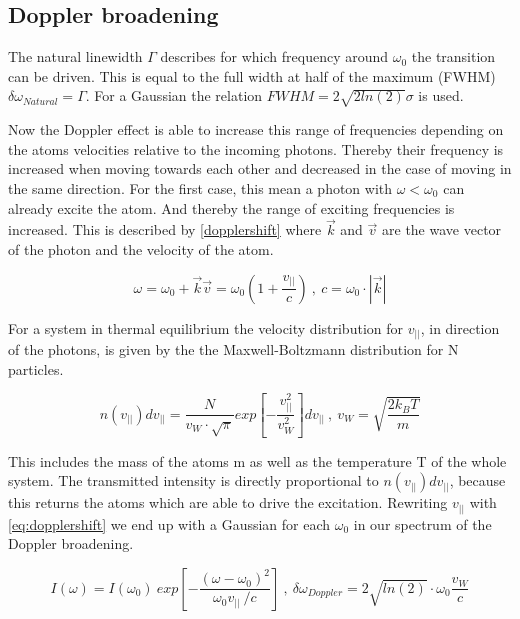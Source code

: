 \documentclass[]{article}
\begin{document}
\subsection{Doppler broadening}
The natural linewidth $\Gamma$ describes for which frequency around $\omega_0$ the transition can be driven. This is equal to the full width at half of the maximum (FWHM) $\delta\omega_{Natural} = \Gamma$. For a Gaussian the relation $FWHM = 2 \sqrt{2ln(2)} \sigma$ is used.

Now the Doppler effect is able to increase this range of frequencies depending on the atoms velocities relative to the incoming photons. Thereby their frequency is increased when moving towards each other and decreased in the case of moving in the same direction. For the first case, this mean a photon with $\omega < \omega_0$ can already excite the atom. And thereby the range of exciting frequencies is increased. This is described by \autoref{dopplershift} where $\vec{k}$ and $\vec{v}$ are the wave vector of the photon and the velocity of the atom.

\begin{equation}
\omega  = \omega_0 + \vec{k}\vec{v} = \omega_0 \left(1+\frac{v_{||}}{c} \right)\:,\: c = \omega_0\cdot |\vec{k}|
\label{eq:dopplershift}
\end{equation}

For a system in thermal equilibrium the velocity distribution for $v_{||}$, in direction of the photons, is given by the the Maxwell-Boltzmann distribution for N particles. 

\begin{equation}
n(v_{||})dv_{||} = \frac{N}{v_W \cdot \sqrt{\pi}} exp\left[ - \frac{v_{||}^2}{v_W^2} \right] dv_{||} \:,\: v_W= \sqrt{\frac{2k_BT}{m}}
\end{equation}

This includes the mass of the atoms m as well as the temperature T of the whole system. The transmitted intensity is directly proportional to $n(v_{||}) dv_{||}$, because this returns the atoms which are able to drive the excitation. Rewriting $v_{||}$ with \autoref{eq:dopplershift} we end up with a Gaussian for each $\omega_0$ in our spectrum of the Doppler broadening.

\begin{equation}
I(\omega)=I(\omega_0)\ exp\left[ - \frac{(\omega-\omega_0)^2}{\omega_0v_{||}\ / c}\right] \:,\: \delta\omega_{Doppler} = 2 \sqrt{ln(2)} \cdot \omega_0\frac{v_W}{c}
\label{eq:gauss}
\end{equation}
\end{document}

